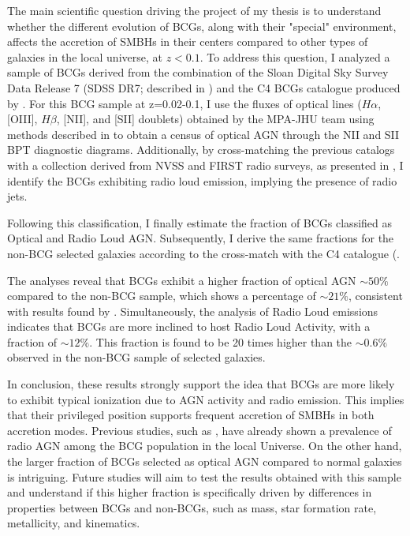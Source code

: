 The main scientific question driving the project of my thesis is to understand whether the different evolution of BCGs, along with their "special" environment, affects the accretion of SMBHs in their centers compared to other types of galaxies in the local universe, at $z<0.1$. To address this question, I analyzed a sample of BCGs derived from the combination of the Sloan Digital Sky Survey Data Release 7 (SDSS DR7; described in \cite{2009ApJS..182..543A}) and the C4 BCGs catalogue produced by \cite{2005AJ....130..968M}. For this BCG sample at z=0.02-0.1, I use the fluxes of optical lines ($H\alpha$, [OIII], $H\beta$, [NII], and [SII] doublets) obtained by the MPA-JHU team using methods described in \cite{1994ApJ...422..158O} to obtain a census of optical AGN through the NII and SII BPT diagnostic diagrams. Additionally, by cross-matching the previous catalogs with a collection derived from NVSS and FIRST radio surveys, as presented in \cite{2005MNRAS.362....9B}, I identify the BCGs exhibiting radio loud emission, implying the presence of radio jets.

Following this classification, I finally estimate the fraction of BCGs classified as Optical and Radio Loud AGN. Subsequently, I derive the same fractions for the non-BCG selected galaxies according to the cross-match with the C4 catalogue  (\cite{2005AJ....130..968M}.

The analyses reveal that BCGs exhibit a higher fraction of optical AGN $\sim50\%$ compared to the non-BCG sample, which shows a percentage of $\sim 21\%$, consistent with results found by \cite{2012A&A...546A..17V}.
Simultaneously, the analysis of Radio Loud emissions indicates that BCGs are more inclined to host Radio Loud Activity, with a fraction of  $\sim 12 \%$. This fraction is found to be 20 times higher than the $\sim 0.6\%$ observed in the non-BCG sample of selected galaxies.

In conclusion, these results strongly support the idea that BCGs are more likely to exhibit typical ionization due to AGN activity and radio emission. This implies that their privileged position supports frequent accretion of SMBHs in both accretion modes. Previous studies, such as \cite{2016MNRAS.460.3669Y, 2014MNRAS.440..762O, 2007MNRAS.379..867V}, have already shown a prevalence of radio AGN among the BCG population in the local Universe.  
On the other hand, the larger fraction of BCGs selected as optical AGN compared to normal galaxies is intriguing. Future studies will aim to test the results obtained with this sample and understand if this higher fraction is specifically driven by differences in properties between BCGs and non-BCGs, such as mass, star formation rate, metallicity, and kinematics.



